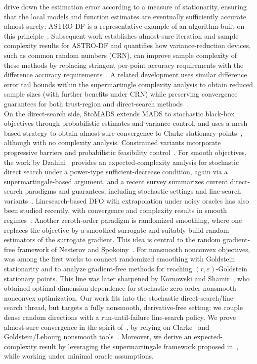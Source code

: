 \documentclass[11pt,a4paper]{article}
\begin{document}
drive down the estimation error according to a measure of stationarity, ensuring that the local models and function estimates are eventually sufficiently accurate almost surely; ASTRO-DF is a representative example of an algorithm built on this principle~\cite{MR3880261}. Subsequent work establishes almost-sure iteration and sample complexity results for ASTRO-DF and quantifies how variance-reduction devices, such as common random numbers (CRN), can improve sample complexity of these methods by replacing stringent per-point accuracy requirements with the difference accuracy requirements~\cite{MR4959972}. A related development %
uses similar difference error tail bounds within the supermartingle complexity analysis to obtain %
reduced sample sizes (with further benefits under CRN) while preserving convergence guarantees for both trust-region and direct-search methods~\cite{MR4758401}.\\
On the direct-search side, StoMADS extends MADS to stochastic black-box objectives through probabilistic estimates and variance control, and uses a mesh-based strategy to obtain almost-sure convergence to Clarke stationary points~\cite{MR4238147}, although with no complexity analysis. %
Constrained variants incorporate progressive barriers and probabilistic feasibility control~\cite{MR4550962}. For smooth objectives, the work by Dzahini~\cite{MR4359469} provides an expected-complexity analysis for stochastic direct search under a power-type sufficient-decrease condition, again via a supermartingale-based argument, and a recent survey summarizes current direct-search paradigms and guarantees, including stochastic settings and line-search variants~\cite{MR4919092}. Linesearch-based DFO with extrapolation under noisy oracles has also been studied recently, with convergence and complexity results in smooth regimes~\cite{desantis2025linesearchbasedderivativefreemethodnoisy}. Another zeroth-order paradigm is randomized smoothing, where one replaces the
objective by a smoothed surrogate and suitably build random estimators of the surrogate gradient. This idea is
central to the random gradient-free framework of Nesterov and
Spokoiny~\cite{MR3627456}. For nonsmooth nonconvex objectives, \cite{LinEtAl2022GFM} was among the first works to connect randomized smoothing
with Goldstein stationarity and to analyze gradient-free methods for reaching
\((r,\varepsilon)\)-Goldstein stationary points. This line was later sharpened
by Kornowski and Shamir~\cite{JMLR:kornowskishamir}, who obtained optimal
dimension-dependence for stochastic zero-order nonsmooth nonconvex optimization.
Our work fits into the stochastic direct-search/line-search thread, but targets a fully nonsmooth, derivative-free setting: we couple dense random directions with a run-until-failure line-search policy. We prove almost-sure convergence in the spirit of~\cite{MR4758401}, by relying on Clarke~\cite{Clarke1990} and Goldstein/Lebourg nonsmooth tools~\cite{Goldstein1977,Jahn1996}. Moreover, we derive an expected-complexity result by leveraging the supermartingale framework proposed in~\cite{MR4151319}, while working under minimal oracle assumptions.
\end{document}
